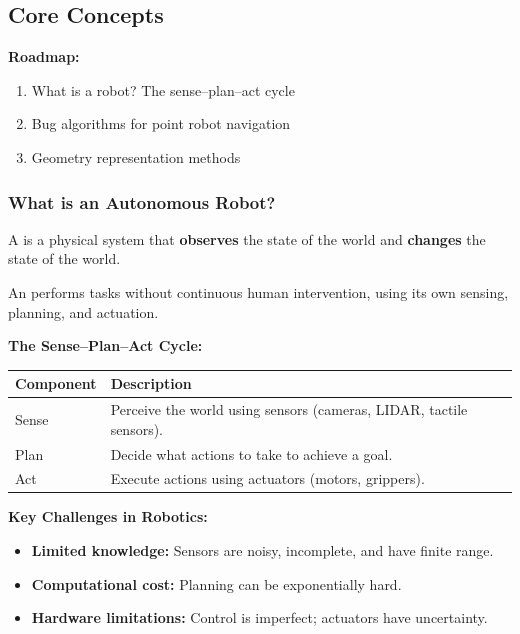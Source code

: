 \bigseparator

\subsection{Core Concepts}

\textbf{Roadmap:}
\begin{enumerate}
  \item What is a robot? The sense--plan--act cycle
  \item Bug algorithms for point robot navigation
  \item Geometry representation methods
\end{enumerate}

\subsubsection{What is an Autonomous Robot?}

\begin{defbox}[Robot]
A  is a physical system that \textbf{observes} the state of the world and \textbf{changes} the state of the world.
\end{defbox}

\begin{defbox}
An  performs tasks without continuous human intervention, using its own sensing, planning, and actuation.
\end{defbox}

\textbf{The Sense--Plan--Act Cycle:}
\begin{center}
\begin{tabular}{@{} l p{10cm} @{}}
\toprule
\textbf{Component} & \textbf{Description} \\
\midrule
Sense & Perceive the world using sensors (cameras, LIDAR, tactile sensors). \\
Plan & Decide what actions to take to achieve a goal. \\
Act & Execute actions using actuators (motors, grippers). \\
\bottomrule
\end{tabular}
\end{center}

\textbf{Key Challenges in Robotics:}
\begin{itemize}
  \item \textbf{Limited knowledge:} Sensors are noisy, incomplete, and have finite range.
  \item \textbf{Computational cost:} Planning can be exponentially hard.
  \item \textbf{Hardware limitations:} Control is imperfect; actuators have uncertainty.
\end{itemize}

